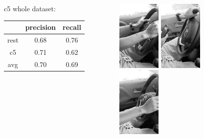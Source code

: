 \documentclass{beamer}
\begin{document}
\begin{frame}
\begin{columns}
\begin{column}{0.5\textwidth}
    			\vspace{0.5cm}
    			c5 whole dataset:
    			\begin{tabular}{c|cc}
    				& precision & recall \\ 
    				\hline rest & 0.68 & 0.76 \\ 
    				c5 & 0.71 & 0.62 \\ 
    				\hline avg & 0.70 & 0.69 \\  
    			\end{tabular} 
    		\end{column}
    		\begin{column}{0.5\textwidth}  %
    			\begin{center}
    				\includegraphics[width=0.3\textwidth]{steering_wheel1} \hspace{0.1cm}
    				\includegraphics[width=0.3\textwidth]{steering_wheel2} \\\vspace{0.1cm}
    				\includegraphics[width=0.3\textwidth]{steering_wheel3}\hspace{0.1cm}

\end{center}
\end{column}
\end{columns}
\end{frame}
\end{document}
